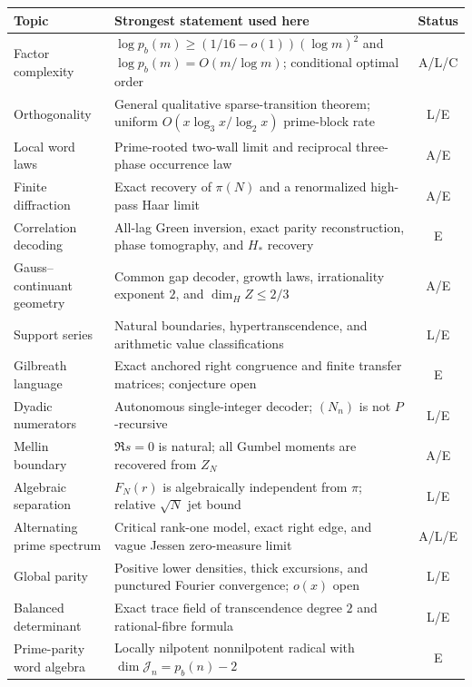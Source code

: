 \documentclass[11pt]{article}
\theoremstyle{definition}
\theoremstyle{remark}
\begin{document}
\begin{center}
\small
\begin{tabularx}{\textwidth}{@{}>{\raggedright\arraybackslash}p{}
 >{\raggedright\arraybackslash}p{}c@{}}
\toprule
Topic & Strongest statement used here & Status\\
\midrule
Factor complexity &
$\log p_b(m)\ge(1/16-o(1))(\log m)^2$ and
$\log p_b(m)=O(m/\log m)$; conditional optimal order & A/L/C\\
Orthogonality &
General qualitative sparse-transition theorem; uniform
$O(x\log_3x/\log_2x)$ prime-block rate & L/E\\
Local word laws &
Prime-rooted two-wall limit and reciprocal three-phase occurrence law & A/E\\
Finite diffraction &
Exact recovery of $\pi(N)$ and a renormalized high-pass Haar limit & A/E\\
Correlation decoding &
All-lag Green inversion, exact parity reconstruction, phase tomography, and $H_*$ recovery & E\\
Gauss--continuant geometry &
Common gap decoder, growth laws, irrationality exponent $2$, and $\dim_H Z\le2/3$ & A/E\\
Support series &
Natural boundaries, hypertranscendence, and arithmetic value classifications & L/E\\
Gilbreath language &
Exact anchored right congruence and finite transfer matrices; conjecture open & E\\
Dyadic numerators &
Autonomous single-integer decoder; $(N_n)$ is not $P$-recursive & L/E\\
Mellin boundary &
$\Re s=0$ is natural; all Gumbel moments are recovered from $Z_N$ & A/E\\
Algebraic separation &
$F_N(r)$ is algebraically independent from $\pi$; relative $\sqrt N$ jet bound & L/E\\
Alternating prime spectrum &
Critical rank-one model, exact right edge, and vague Jessen zero-measure limit & A/L/E\\
Global parity &
Positive lower densities, thick excursions, and punctured Fourier convergence; $o(x)$ open & L/E\\
Balanced determinant &
Exact trace field of transcendence degree $2$ and rational-fibre formula & L/E\\
Prime-parity word algebra &
Locally nilpotent nonnilpotent radical with $\dim\mathcal J_n=p_b(n)-2$ & E\\
\bottomrule
\end{tabularx}
\end{center}
\end{document}
